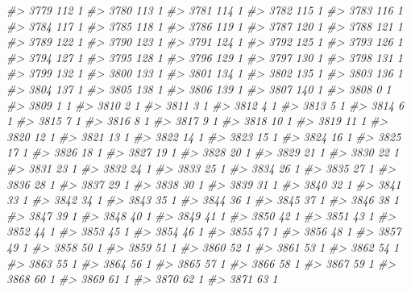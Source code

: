 \documentclass[]{article}
\newenvironment{Shaded}{\begin{snugshade}}{\end{snugshade}}
\newcommand{\CommentTok}[1]{\textcolor[rgb]{0.56,0.35,0.01}{\textit{#1}}}
\begin{document}
\begin{Shaded}
\begin{Highlighting}[]
\CommentTok{#> 3779 112  1}
\CommentTok{#> 3780 113  1}
\CommentTok{#> 3781 114  1}
\CommentTok{#> 3782 115  1}
\CommentTok{#> 3783 116  1}
\CommentTok{#> 3784 117  1}
\CommentTok{#> 3785 118  1}
\CommentTok{#> 3786 119  1}
\CommentTok{#> 3787 120  1}
\CommentTok{#> 3788 121  1}
\CommentTok{#> 3789 122  1}
\CommentTok{#> 3790 123  1}
\CommentTok{#> 3791 124  1}
\CommentTok{#> 3792 125  1}
\CommentTok{#> 3793 126  1}
\CommentTok{#> 3794 127  1}
\CommentTok{#> 3795 128  1}
\CommentTok{#> 3796 129  1}
\CommentTok{#> 3797 130  1}
\CommentTok{#> 3798 131  1}
\CommentTok{#> 3799 132  1}
\CommentTok{#> 3800 133  1}
\CommentTok{#> 3801 134  1}
\CommentTok{#> 3802 135  1}
\CommentTok{#> 3803 136  1}
\CommentTok{#> 3804 137  1}
\CommentTok{#> 3805 138  1}
\CommentTok{#> 3806 139  1}
\CommentTok{#> 3807 140  1}
\CommentTok{#> 3808   0  1}
\CommentTok{#> 3809   1  1}
\CommentTok{#> 3810   2  1}
\CommentTok{#> 3811   3  1}
\CommentTok{#> 3812   4  1}
\CommentTok{#> 3813   5  1}
\CommentTok{#> 3814   6  1}
\CommentTok{#> 3815   7  1}
\CommentTok{#> 3816   8  1}
\CommentTok{#> 3817   9  1}
\CommentTok{#> 3818  10  1}
\CommentTok{#> 3819  11  1}
\CommentTok{#> 3820  12  1}
\CommentTok{#> 3821  13  1}
\CommentTok{#> 3822  14  1}
\CommentTok{#> 3823  15  1}
\CommentTok{#> 3824  16  1}
\CommentTok{#> 3825  17  1}
\CommentTok{#> 3826  18  1}
\CommentTok{#> 3827  19  1}
\CommentTok{#> 3828  20  1}
\CommentTok{#> 3829  21  1}
\CommentTok{#> 3830  22  1}
\CommentTok{#> 3831  23  1}
\CommentTok{#> 3832  24  1}
\CommentTok{#> 3833  25  1}
\CommentTok{#> 3834  26  1}
\CommentTok{#> 3835  27  1}
\CommentTok{#> 3836  28  1}
\CommentTok{#> 3837  29  1}
\CommentTok{#> 3838  30  1}
\CommentTok{#> 3839  31  1}
\CommentTok{#> 3840  32  1}
\CommentTok{#> 3841  33  1}
\CommentTok{#> 3842  34  1}
\CommentTok{#> 3843  35  1}
\CommentTok{#> 3844  36  1}
\CommentTok{#> 3845  37  1}
\CommentTok{#> 3846  38  1}
\CommentTok{#> 3847  39  1}
\CommentTok{#> 3848  40  1}
\CommentTok{#> 3849  41  1}
\CommentTok{#> 3850  42  1}
\CommentTok{#> 3851  43  1}
\CommentTok{#> 3852  44  1}
\CommentTok{#> 3853  45  1}
\CommentTok{#> 3854  46  1}
\CommentTok{#> 3855  47  1}
\CommentTok{#> 3856  48  1}
\CommentTok{#> 3857  49  1}
\CommentTok{#> 3858  50  1}
\CommentTok{#> 3859  51  1}
\CommentTok{#> 3860  52  1}
\CommentTok{#> 3861  53  1}
\CommentTok{#> 3862  54  1}
\CommentTok{#> 3863  55  1}
\CommentTok{#> 3864  56  1}
\CommentTok{#> 3865  57  1}
\CommentTok{#> 3866  58  1}
\CommentTok{#> 3867  59  1}
\CommentTok{#> 3868  60  1}
\CommentTok{#> 3869  61  1}
\CommentTok{#> 3870  62  1}
\CommentTok{#> 3871  63  1}

\end{Highlighting}
\end{Shaded}
\end{document}
